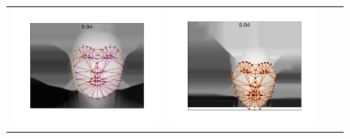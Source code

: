 \begin{figure}
{\begin{tabular}{cccc}
    \includegraphics[valign=m,scale=0.16]{statistical_normals/images/lk2d/aam_error_examples/depth_004_221}      &
    \includegraphics[valign=m,scale=0.16]{statistical_normals/images/lk2d/aam_error_examples/normals_004_478}    &

\end{tabular}}
\end{figure}

